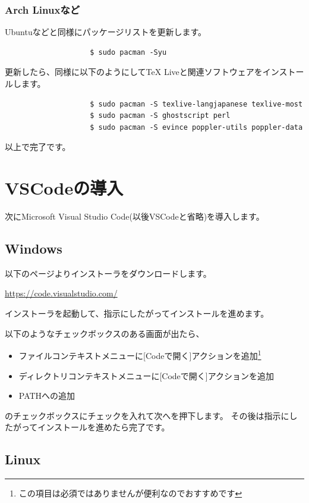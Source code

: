 			\subsubsection{Arch Linuxなど}
				Ubuntuなどと同様にパッケージリストを更新します。
				\begin{mdframed}[style=bash]
					\begin{verbatim}
					$ sudo pacman -Syu
					\end{verbatim}
				\end{mdframed}
				更新したら、同様に以下のようにしてTeX Liveと関連ソフトウェアをインストールします。
				\begin{mdframed}[style=bash]
					\begin{verbatim}
					$ sudo pacman -S texlive-langjapanese texlive-most
					$ sudo pacman -S ghostscript perl
					$ sudo pacman -S evince poppler-utils poppler-data
					\end{verbatim}
				\end{mdframed}
				以上で完了です。

	\section{VSCodeの導入}
		次にMicrosoft Visual Studio Code(以後VSCodeと省略)を導入します。

		\subsection{Windows}
			以下のページよりインストーラをダウンロードします。
			\begin{mdframed}[style=shadow]
				\url{https://code.visualstudio.com/}
			\end{mdframed}
			インストーラを起動して、指示にしたがってインストールを進めます。

			以下のようなチェックボックスのある画面が出たら、
			\begin{itemize}
				\item ファイルコンテキストメニューに[Codeで開く]アクションを追加\footnote[1]{この項目は必須ではありませんが便利なのでおすすめです}
				\item ディレクトリコンテキストメニューに[Codeで開く]アクションを追加\footnotemark[1]
				\item PATHへの追加
			\end{itemize}
			のチェックボックスにチェックを入れて次へを押下します。
			その後は指示にしたがってインストールを進めたら完了です。

		\subsection{Linux}
